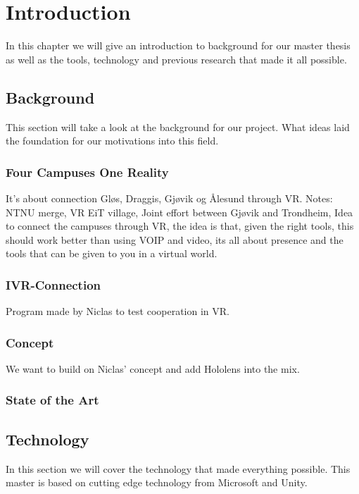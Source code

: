 \chapter{Introduction}
\label{chap:introduction}
In this chapter we will give an introduction to background for our master thesis as well as the tools, technology and previous research that made it all possible. 

\section{Background}
    This section will take a look at the background for our project. What ideas laid the foundation for our motivations into this field.

    \subsection{Four Campuses One Reality}
    It's about connection Gløs, Draggis, Gjøvik og Ålesund through VR.
    Notes: NTNU merge, VR EiT village, Joint effort between Gjøvik and Trondheim, Idea to connect the campuses through VR, the idea is that, given the right tools, this should work better than using VOIP and video, its all about presence and the tools that can be given to you in a virtual world.

    \subsection{IVR-Connection}
    Program made by Niclas to test cooperation in VR.

    \subsection{Concept}
    We want to build on Niclas' concept and add Hololens into the mix.
    
    \subsection{State of the Art}

\section{Technology}
In this section we will cover the technology that made everything possible. This master is based on cutting edge technology from Microsoft and Unity.

